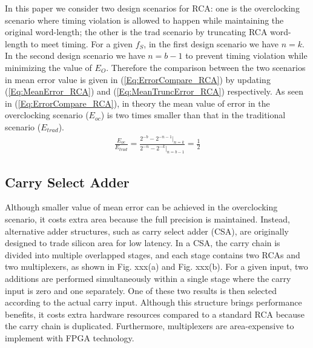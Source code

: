 \documentclass[10pt, conference, compsocconf]{IEEEtran}
\begin{document}
In this paper we consider two design scenarios for RCA: one is the overclocking scenario where timing violation is allowed to happen while maintaining the original word-length; the other is the trad scenario by truncating RCA word-length to meet timing. For a given $f_S$, in the first design scenario we have $n=k$. In the second design scenario we have $n=b-1$ to prevent timing violation while minimizing the value of $E_O$. Therefore the comparison between the two scenarios in mean error value is given in (\ref{Eq:ErrorCompare_RCA}) by updating (\ref{Eq:MeanError_RCA}) and (\ref{Eq:MeanTruncError_RCA}) respectively. As seen in (\ref{Eq:ErrorCompare_RCA}), in theory the mean value of error in the overclocking scenario ($E_{oc}$) is two times smaller than that in the traditional scenario ($E_{trad}$).
%
\begin{eqnarray}\label{Eq:ErrorCompare_RCA}
    \frac{E_{oc}}{E_{trad}} = \frac{2^{-b}-2^{-n-1}|_{n=k}}{2^{-n}-2^{-k}|_{n=b-1}}=\frac{1}{2}
\end{eqnarray}

\subsection{Carry Select Adder}
Although smaller value of mean error can be achieved in the overclocking scenario, it costs extra area because the full precision is maintained. Instead, alternative adder structures, such as carry select adder (CSA), are originally designed to trade silicon area for low latency. In a CSA, the carry chain is divided into multiple overlapped stages, and each stage contains two RCAs and two multiplexers, as shown in Fig. xxx(a) and Fig. xxx(b). For a given input, two additions are performed simultaneously within a single stage where the carry input is zero and one separately. One of these two results is then selected according to the actual carry input. Although this structure brings performance benefits, it costs extra hardware resources compared to a standard RCA because the carry chain is duplicated. Furthermore, multiplexers are area-expensive to implement with FPGA technology.
\end{document}
